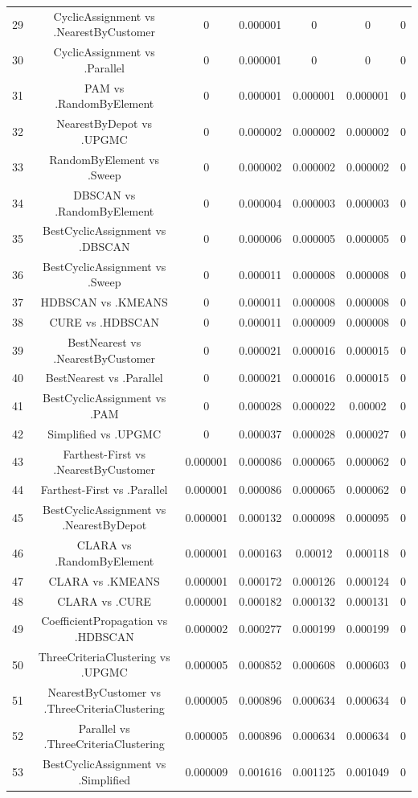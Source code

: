 \documentclass[a4paper,10pt]{article}
\begin{document}
\begin{landscape}
\begin{table}[!htp]
\begin{tabular}{ccccccc}
29&CyclicAssignment vs .NearestByCustomer&0&0.000001&0&0&0\\
30&CyclicAssignment vs .Parallel&0&0.000001&0&0&0\\
31&PAM vs .RandomByElement&0&0.000001&0.000001&0.000001&0\\
32&NearestByDepot vs .UPGMC&0&0.000002&0.000002&0.000002&0\\
33&RandomByElement vs .Sweep&0&0.000002&0.000002&0.000002&0\\
34&DBSCAN vs .RandomByElement&0&0.000004&0.000003&0.000003&0\\
35&BestCyclicAssignment vs .DBSCAN&0&0.000006&0.000005&0.000005&0\\
36&BestCyclicAssignment vs .Sweep&0&0.000011&0.000008&0.000008&0\\
37&HDBSCAN vs .KMEANS&0&0.000011&0.000008&0.000008&0\\
38&CURE vs .HDBSCAN&0&0.000011&0.000009&0.000008&0\\
39&BestNearest vs .NearestByCustomer&0&0.000021&0.000016&0.000015&0\\
40&BestNearest vs .Parallel&0&0.000021&0.000016&0.000015&0\\
41&BestCyclicAssignment vs .PAM&0&0.000028&0.000022&0.00002&0\\
42&Simplified vs .UPGMC&0&0.000037&0.000028&0.000027&0\\
43&Farthest-First vs .NearestByCustomer&0.000001&0.000086&0.000065&0.000062&0\\
44&Farthest-First vs .Parallel&0.000001&0.000086&0.000065&0.000062&0\\
45&BestCyclicAssignment vs .NearestByDepot&0.000001&0.000132&0.000098&0.000095&0\\
46&CLARA vs .RandomByElement&0.000001&0.000163&0.00012&0.000118&0\\
47&CLARA vs .KMEANS&0.000001&0.000172&0.000126&0.000124&0\\
48&CLARA vs .CURE&0.000001&0.000182&0.000132&0.000131&0\\
49&CoefficientPropagation vs .HDBSCAN&0.000002&0.000277&0.000199&0.000199&0\\
50&ThreeCriteriaClustering vs .UPGMC&0.000005&0.000852&0.000608&0.000603&0\\
51&NearestByCustomer vs .ThreeCriteriaClustering&0.000005&0.000896&0.000634&0.000634&0\\
52&Parallel vs .ThreeCriteriaClustering&0.000005&0.000896&0.000634&0.000634&0\\
53&BestCyclicAssignment vs .Simplified&0.000009&0.001616&0.001125&0.001049&0\\

\end{tabular}
\end{table}
\end{landscape}
\end{document}
